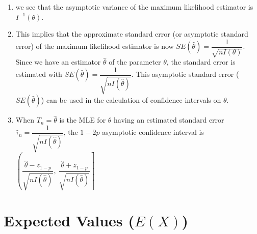 \begin{enumerate}
    \item we see that the asymptotic variance of the maximum likelihood estimator is $I ^{-1}(\theta)$.
    \hfill \cite{statistics/book/Statistics-for-Data-Scientists/Maurits-Kaptein}

    \item This implies that the approximate standard error (or asymptotic standard error) of the maximum likelihood estimator is now $S E( \hat{\theta}) = \dfrac{1}{\sqrt{n I (\theta)}}$.
    Since we have an estimator $\hat{\theta}$ of the parameter $\theta$, the standard error is estimated with $\hat{SE}( \hat{\theta}) = \dfrac{1}{\sqrt{n I (\hat{\theta})}}$.
    This asymptotic standard error ($S E( \hat{\theta})$) can be used in the calculation of confidence intervals on $\theta$.
    \hfill \cite{statistics/book/Statistics-for-Data-Scientists/Maurits-Kaptein}

    \item When $T_n = \hat{\theta}$ is the MLE for $\theta$ having an estimated standard error $\hat{\tau}_n = \dfrac{1}{\sqrt{n I ( \hat{\theta})}}$, the $1 - 2 p$ asymptotic confidence interval is
    $
        \left(
        \dfrac{\hat{\theta} - z_{1-p}} {\sqrt{n I ( \hat{\theta})}},
        \ \dfrac{\hat{\theta} + z_{1-p}} {\sqrt{n I ( \hat{\theta})} }
        \right]
    $
    \hfill \cite{statistics/book/Statistics-for-Data-Scientists/Maurits-Kaptein}
\end{enumerate}






\section{Expected Values ($E(X)$)}

